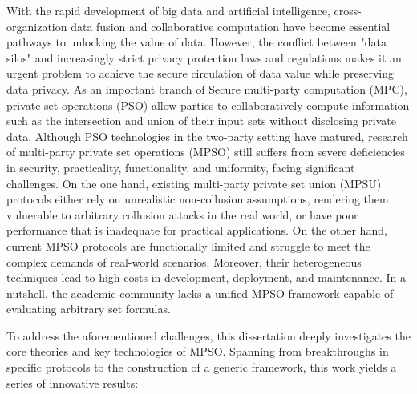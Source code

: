 \begin{enabstract}

    With the rapid development of big data and artificial intelligence, cross-organization data fusion and collaborative computation have become essential pathways to unlocking the value of data. However, the conflict between "data silos" and increasingly strict privacy protection laws and regulations makes it an urgent problem to achieve the secure circulation of data value while preserving data privacy. As an important branch of Secure multi-party computation (MPC), private set operations (PSO) allow parties to collaboratively compute information such as the intersection and union of their input sets without disclosing private data. Although PSO technologies in the two-party setting have matured, research of multi-party private set operations (MPSO) still suffers from severe deficiencies in security, practicality, functionality, and uniformity, facing significant challenges. On the one hand, existing multi-party private set union (MPSU) protocols either rely on unrealistic non-collusion assumptions, rendering them vulnerable to arbitrary collusion attacks in the real world, or have poor performance that is inadequate for practical applications. On the other hand, current MPSO protocols are functionally limited and struggle to meet the complex demands of real-world scenarios. Moreover, their heterogeneous techniques lead to high costs in development, deployment, and maintenance. In a nutshell, the academic community lacks a unified MPSO framework capable of evaluating arbitrary set formulas.

    To address the aforementioned challenges, this dissertation deeply investigates the core theories and key technologies of MPSO. Spanning from breakthroughs in specific protocols to the construction of a generic framework, this work yields a series of innovative results:


\end{enabstract}
